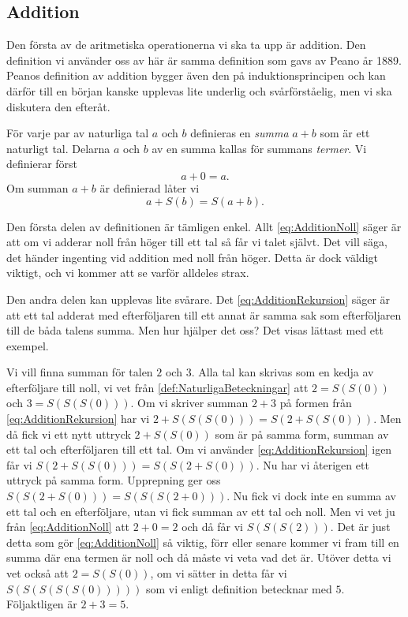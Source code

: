 \subsection{Addition}
Den första av de aritmetiska operationerna vi ska ta upp är addition.
Den definition vi använder oss av här är samma definition som gavs av Peano år 
1889.
Peanos definition av addition bygger även den på induktionsprincipen och kan
därför till en början kanske upplevas lite underlig och svårförståelig, men vi
ska diskutera den efteråt.
\begin{definition}[Summa]\label{def:NaturligaSumma}\index{\(+\)}
  För varje par av naturliga tal \(a\) och \(b\) definieras en \emph{summa}
  \(a+b\) som är ett naturligt tal.
  Delarna \(a\) och \(b\) av en summa kallas för summans \emph{termer}.
  Vi definierar först
  \begin{equation}
    \label{eq:AdditionNoll}
    a+0 = a.
  \end{equation}
  Om summan \(a+b\) är definierad låter vi
  \begin{equation}
    \label{eq:AdditionRekursion}
    a+S(b) = S(a+b).
  \end{equation}
\end{definition}
Den första delen av definitionen är tämligen enkel.
Allt \cref{eq:AdditionNoll} säger är att om vi adderar noll från höger till
ett tal så får vi talet självt.
Det vill säga, det händer ingenting vid addition med noll från höger.
Detta är dock väldigt viktigt, och vi kommer att se varför alldeles strax. 

Den andra delen kan upplevas lite svårare.
Det \cref{eq:AdditionRekursion} säger är att ett tal adderat med efterföljaren
till ett annat är samma sak som efterföljaren till de båda talens summa.
Men hur hjälper det oss?
Det visas lättast med ett exempel.
\begin{example}
  Vi vill finna summan för talen \(2\) och \(3\).
  Alla tal kan skrivas som en kedja av efterföljare till noll, vi vet från
  \cref{def:NaturligaBeteckningar} att \(2=S(S(0))\) och \(3=S(S(S(0)))\).
  Om vi skriver summan \(2+3\) på formen från
  \cref{eq:AdditionRekursion} har vi \(2+S(S(S(0)))=S(2+S(S(0)))\).
  Men då fick vi ett nytt uttryck \(2+S(S(0))\) som är på samma form, summan
  av ett tal och efterföljaren till ett tal.
  Om vi använder \cref{eq:AdditionRekursion} igen får vi
  \(S(2+S(S(0)))=S(S(2+S(0)))\).
  Nu har vi återigen ett uttryck på samma form.
  Upprepning ger oss \(S(S(2+S(0)))=S(S(S(2+0)))\).
  Nu fick vi dock inte en summa av ett tal och en efterföljare, utan
  vi fick summan av ett tal och noll.
  Men vi vet ju från \cref{eq:AdditionNoll} att \(2+0=2\) och då får vi
  \(S(S(S(2)))\).
  Det är just detta som gör \cref{eq:AdditionNoll} så viktig, förr eller
  senare kommer vi fram till en summa där ena termen är noll och då måste vi
  veta vad det är.
  Utöver detta vi vet också att \(2=S(S(0))\), om vi sätter in detta får vi
  \(S(S(S(S(S(0)))))\) som vi enligt definition betecknar med \(5\).
  Följaktligen är \(2+3=5\).
\end{example}

